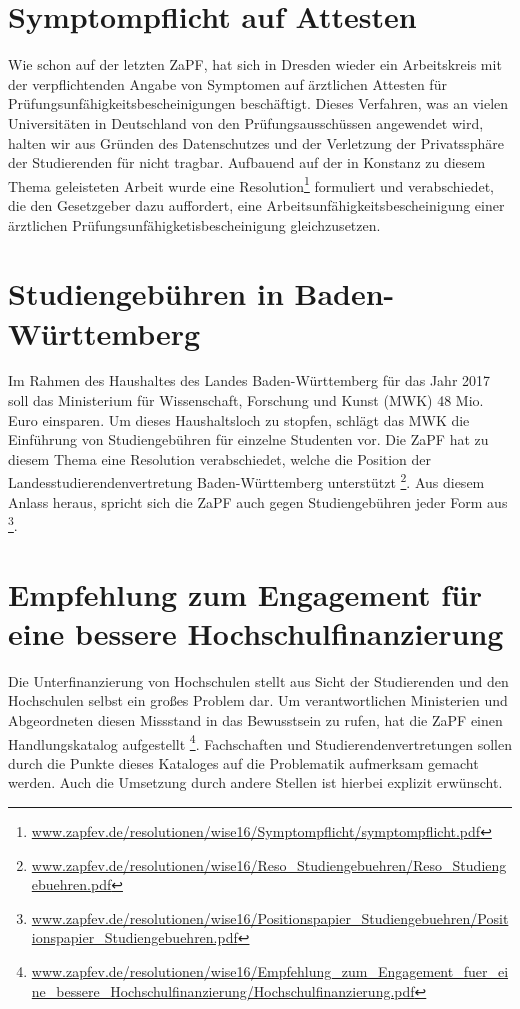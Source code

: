 \section*{Symptompflicht auf Attesten}
Wie schon auf der letzten ZaPF, hat sich in Dresden wieder ein Arbeitskreis mit der verpflichtenden Angabe von Symptomen auf ärztlichen Attesten für 
Prüfungsunfähigkeitsbescheinigungen beschäftigt. Dieses Verfahren, was an vielen Universitäten in Deutschland von den Prüfungsausschüssen angewendet wird, 
halten wir aus Gründen des Datenschutzes und der Verletzung der Privatssphäre der Studierenden für nicht tragbar. Aufbauend auf der in Konstanz zu diesem 
Thema geleisteten Arbeit wurde eine Resolution\footnote{\href{https://zapfev.de/resolutionen/wise16/Symptompflicht/symptompflicht.pdf}{\url{www.zapfev.de/resolutionen/wise16/Symptompflicht/symptompflicht.pdf}}} 
formuliert und verabschiedet, die den Gesetzgeber dazu auffordert, eine Arbeitsunfähigkeitsbescheinigung einer ärztlichen Prüfungsunfähigketisbescheinigung gleichzusetzen.

\section*{Studiengebühren in Baden-Württemberg}
Im Rahmen des Haushaltes des Landes Baden-Württemberg für das Jahr 2017 soll das Ministerium für Wissenschaft, Forschung und Kunst (MWK) 48 Mio. Euro einsparen. 
Um dieses Haushaltsloch zu stopfen, schlägt das MWK die Einführung von Studiengebühren für einzelne Studenten vor. Die ZaPF hat zu diesem Thema eine Resolution verabschiedet, 
welche die Position der Landesstudierendenvertretung Baden-Württemberg unterstützt 
\footnote{\href{https://zapfev.de/resolutionen/wise16/Reso_Studiengebuehren/Reso_Studiengebuehren.pdf}{\url{www.zapfev.de/resolutionen/wise16/Reso_Studiengebuehren/Reso_Studiengebuehren.pdf}}}. 
Aus diesem Anlass heraus, spricht sich die ZaPF auch gegen Studiengebühren jeder Form aus
\footnote{\href{https://zapfev.de/resolutionen/wise16/Positionspapier_Studiengebuehren/Positionspapier_Studiengebuehren.pdf}{\url{www.zapfev.de/resolutionen/wise16/Positionspapier_Studiengebuehren/Positionspapier_Studiengebuehren.pdf}}}.

\section*{Empfehlung zum Engagement für eine bessere Hochschulfinanzierung}
Die Unterfinanzierung von Hochschulen stellt aus Sicht der Studierenden und den Hochschulen selbst ein großes Problem dar. Um verantwortlichen Ministerien und Abgeordneten 
diesen Missstand in das Bewusstsein zu rufen, hat die ZaPF einen Handlungskatalog aufgestellt
\footnote{\href{https://zapfev.de/resolutionen/wise16/Empfehlung_zum_Engagement_fuer_eine_bessere_Hochschulfinanzierung/Hochschulfinanzierung.pdf}{\url{www.zapfev.de/resolutionen/wise16/Empfehlung_zum_Engagement_fuer_eine_bessere_Hochschulfinanzierung/Hochschulfinanzierung.pdf}}}. 
Fachschaften und Studierendenvertretungen sollen durch die Punkte dieses Kataloges auf die Problematik aufmerksam gemacht werden. Auch die Umsetzung durch andere Stellen ist 
hierbei explizit erwünscht.

